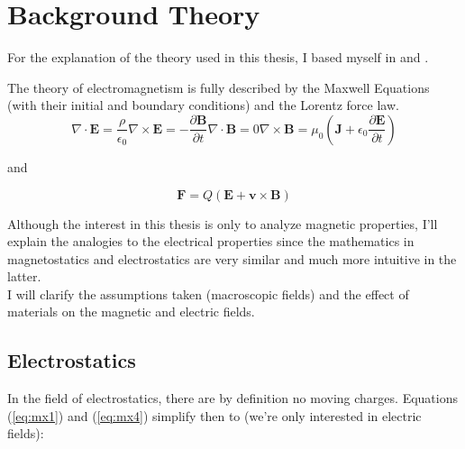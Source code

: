 \section{Background Theory}
\label{s:Theory}

For the explanation of the theory used in this thesis, I based myself in \cite{Griffiths2005} and \cite{leuchtmann2005}.

The theory of electromagnetism is fully described by the Maxwell Equations (with their initial and boundary conditions) and the Lorentz force law. 
\begin{subequations}
\begin{equation}\label{eq:mx1}
\nabla \cdot \textbf{E} = \frac{\rho}{\epsilon_0}
\end{equation}
\begin{equation}\label{eq:mx2}
\nabla \times \textbf{E} = -\frac{\partial\textbf{B}}{\partial{t}}
\end{equation}
\begin{equation}\label{eq:mx3}
\nabla \cdot \textbf{B} = 0
\end{equation}
\begin{equation}\label{eq:mx4}
\nabla \times \textbf{B} = \mu_0(\textbf{J} + \epsilon_0\frac{\partial\textbf{E}}{\partial t})
\end{equation}
\end{subequations}

and

\begin{equation}\label{eq:lorentz}
\textbf{F} = Q(\textbf{E}+\textbf{v}\times\textbf{B})
\end{equation}

Although the interest in this thesis is only to analyze magnetic properties, I'll explain the analogies to the electrical properties since the mathematics in magnetostatics and electrostatics are very similar and much more intuitive in the latter.\\

I will  clarify the assumptions taken (macroscopic fields) and the effect of materials on the magnetic and electric fields.

\subsection{Electrostatics}

In the field of electrostatics, there are by definition no moving charges.  Equations (\ref{eq:mx1}) and (\ref{eq:mx4}) simplify then to (we're only interested in electric fields):

